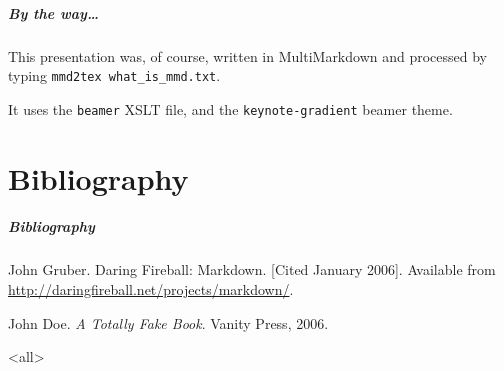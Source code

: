 \begin{frame}

\frametitle{By the way{\ldots}}
\label{bytheway}

This presentation was, of course, written in MultiMarkdown and processed by
typing \texttt{mmd2tex what\_is\_mmd.txt}.

It uses the \texttt{beamer} XSLT file, and the \texttt{keynote-gradient} beamer theme.

\end{frame}

\part{Bibliography}
\begin{frame}[allowframebreaks]
\frametitle{Bibliography}
\def\newblock{}
\begin{thebibliography}{0}
John Gruber. Daring Fireball: Markdown. [Cited January 2006]. Available from \href{http://daringfireball.net/projects/markdown/}{http:/\slash daringfireball.net\slash projects\slash markdown\slash }.


John Doe. \emph{A Totally Fake Book}. Vanity Press, 2006.


\end{thebibliography}
\end{frame}

\mode<all>


\mode*

